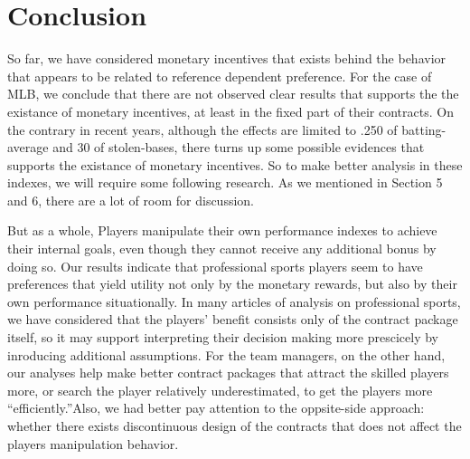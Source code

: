 \documentclass[dvipdfmx, 12pt]{article}
\begin{document}
\begin{landscape}
  \begin{table}
    
  \end{table}
\end{landscape}

\begin{landscape}
  \begin{table}
    
  \end{table}
\end{landscape}


\section{Conclusion}

So far, we have considered monetary incentives that exists behind the behavior that appears to be related to reference dependent preference. For the case of MLB, we conclude that there are not observed clear results that supports the the existance of monetary incentives, at least in the fixed part of their contracts. On the contrary in recent years, although the effects are limited to .250 of batting-average and 30 of stolen-bases, there turns up some possible evidences that supports the existance of monetary incentives. So to make better analysis in these indexes, we will require some following research. As we mentioned in Section 5 and 6, there are a lot of room for discussion.

But as a whole, Players manipulate their own performance indexes to achieve their internal goals, even though they cannot receive any additional bonus by doing so. Our results indicate that professional sports players seem to have preferences that yield utility not only by the monetary rewards, but also by their own performance situationally. In many articles of analysis on professional sports, we have considered that the players' benefit consists only of the contract package itself, so it may support interpreting their decision making more prescicely by inroducing additional assumptions. For the team managers, on the other hand, our analyses help make better contract packages that attract the skilled players more, or search the player relatively underestimated, to get the players more ``efficiently.''Also, we had better pay attention to the oppsite-side approach: whether there exists discontinuous design of the contracts that does not affect the players manipulation behavior.
\end{document}
